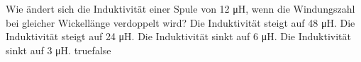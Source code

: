     {Wie ändert sich die Induktivität einer Spule von 12 \si{\micro\henry}, wenn die Windungszahl bei gleicher Wickellänge verdoppelt wird?}
    {Die Induktivität steigt auf 48 \si{\micro\henry}.}
    {Die Induktivität steigt auf 24 \si{\micro\henry}.}
    {Die Induktivität sinkt auf 6 \si{\micro\henry}.}
    {Die Induktivität sinkt auf 3 \si{\micro\henry}.}
    {true}{false}